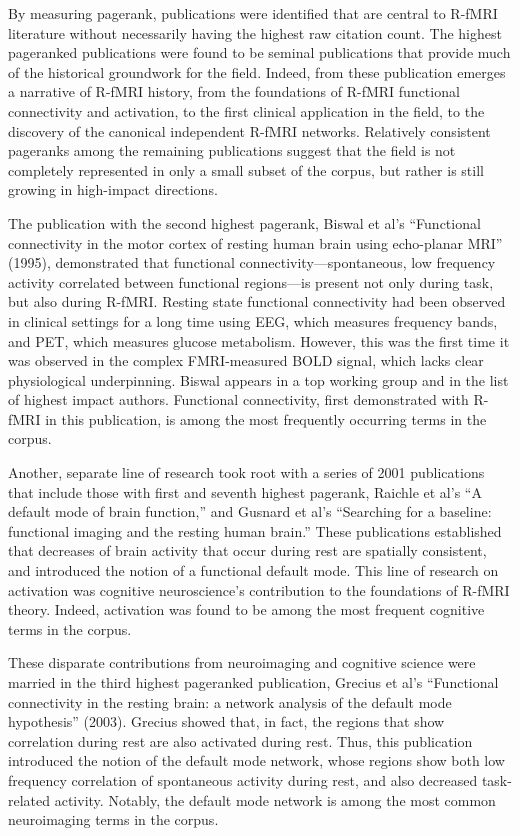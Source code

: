 \documentclass[12pt,3p]{elsarticle}
\begin{document}
By measuring pagerank, publications were identified that are central to R-fMRI
literature without necessarily having the highest raw citation count. The
highest pageranked publications were found to be seminal publications that
provide much of the historical groundwork for the field. Indeed, from these
publication emerges a narrative of R-fMRI history, from the foundations of
R-fMRI functional connectivity and activation, to the first clinical application
in the field, to the discovery of the canonical independent R-fMRI networks.
Relatively consistent pageranks among the remaining publications suggest that
the field is not completely represented in only a small subset of the corpus,
but rather is still growing in high-impact directions. 

The publication with the second highest pagerank, Biswal et al’s ``Functional
connectivity in the motor cortex of resting human brain using echo-planar MRI''
(1995), demonstrated that functional connectivity—spontaneous, low frequency
activity correlated between functional regions—is present not only during task,
but also during R-fMRI. Resting state functional connectivity had been observed
in clinical settings for a long time using EEG, which measures frequency bands,
and PET, which measures glucose metabolism. However, this was the first time it
was observed in the complex FMRI-measured BOLD signal, which lacks clear
physiological underpinning. Biswal appears in a top working group and in the
list of highest impact authors. Functional connectivity, first demonstrated with
R-fMRI in this publication, is among the most frequently occurring terms in the
corpus. 

Another, separate line of research took root with a series of 2001 publications
that include those with first and seventh highest pagerank, Raichle et al’s ``A
default mode of brain function,'' and Gusnard et al’s ``Searching for a baseline:
functional imaging and the resting human brain.'' These publications established
that decreases of brain activity that occur during rest are spatially
consistent, and introduced the notion of a functional default mode. This line of
research on activation was cognitive neuroscience’s contribution to the
foundations of R-fMRI theory. Indeed, activation was found to be among the most
frequent cognitive terms in the corpus.

These disparate contributions from neuroimaging and cognitive science were
married in the third highest pageranked publication, Grecius et al’s ``Functional
connectivity in the resting brain: a network analysis of the default mode
hypothesis'' (2003). Grecius showed that, in fact, the regions that show
correlation during rest are also activated during rest. Thus, this publication
introduced the notion of the default mode network, whose regions show both low
frequency correlation of spontaneous activity during rest, and also decreased
task-related activity. Notably, the default mode network is among the most
common neuroimaging terms in the corpus.
\end{document}
